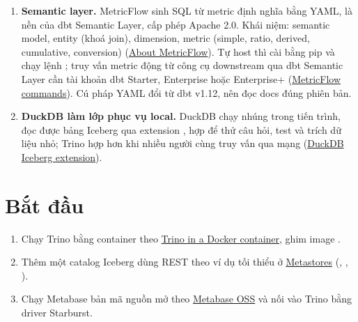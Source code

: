 \begin{enumerate}
  \item \textbf{Semantic layer.} MetricFlow sinh SQL từ metric định nghĩa bằng YAML, là nền của dbt Semantic Layer, cấp phép Apache 2.0. Khái niệm: semantic model, entity (khoá join), dimension, metric (simple, ratio, derived, cumulative, conversion) (\href{https://docs.getdbt.com/docs/build/about-metricflow}{About MetricFlow}). Tự host thì cài  bằng pip và chạy lệnh ; truy vấn metric động từ công cụ downstream qua dbt Semantic Layer cần tài khoản dbt Starter, Enterprise hoặc Enterprise+ (\href{https://docs.getdbt.com/docs/build/metricflow-commands}{MetricFlow commands}). Cú pháp YAML đổi từ dbt v1.12, nên đọc docs đúng phiên bản.
  \item \textbf{DuckDB làm lớp phục vụ local.} DuckDB chạy nhúng trong tiến trình, đọc được bảng Iceberg qua extension , hợp để thử câu hỏi, test và trích dữ liệu nhỏ; Trino hợp hơn khi nhiều người cùng truy vấn qua mạng (\href{https://duckdb.org/docs/2.0/core_extensions/iceberg/overview.html}{DuckDB Iceberg extension}).
\end{enumerate}

\section{Bắt đầu}
\begin{enumerate}
  \item Chạy Trino bằng container theo \href{https://trino.io/docs/current/installation/containers.html}{Trino in a Docker container}, ghim image .
  \item Thêm một catalog Iceberg dùng REST theo ví dụ tối thiểu ở \href{https://trino.io/docs/current/object-storage/metastores.html}{Metastores} (, , ).
  \item Chạy Metabase bản mã nguồn mở theo \href{https://www.metabase.com/start/oss/}{Metabase OSS} và nối vào Trino bằng driver Starburst.
\end{enumerate}


